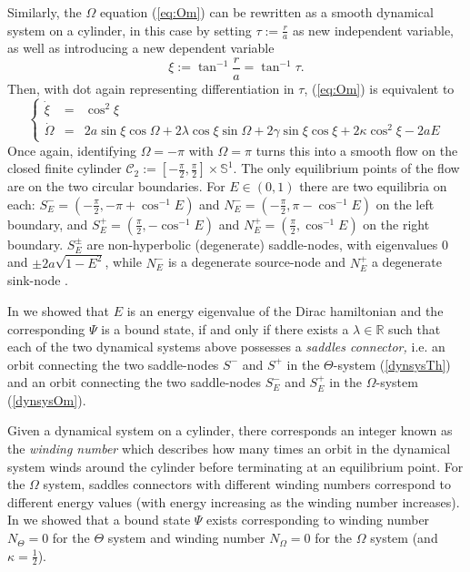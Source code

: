 \documentclass[11 pt]{article}
\newcommand\Om{\Omega}
\renewcommand\({\left(}
\renewcommand\){\right)}
\renewcommand\Om{\Omega}
\newcommand\<{\langle}
\renewcommand\>{\rangle}
\newcommand\8{\infty}
\newcommand\beq{\begin{equation}}
\newcommand\eeq{\end{equation}}
\newcommand{\ga} {\gamma}\newcommand{\Ga}{\Gamma}
\newcommand{\ka} {\kappa}
\newcommand{\la} {\lambda}\newcommand{\La}{\Lambda}
\newcommand{\R}{\mathbb R}
\newcommand{\cC}{\mathcal{C}}
\newcommand{\Sset}{\mathbb{S}}
\newcommand{\half}{\frac{1}{2}}
\begin{document}
Similarly, the $\Om$ equation (\ref{eq:Om}) can  be rewritten as a smooth dynamical system on a cylinder, in this case by setting 
$\tau := \frac{r}{a}$ as new independent variable, as well as introducing a new dependent variable
\beq
\xi := \tan^{-1}\frac{r}{a} = \tan^{-1}\tau.
\eeq
Then, with dot again representing differentiation in $\tau$, (\ref{eq:Om}) is equivalent to
\beq\label{dynsysOm}
\left\{\begin{array}{rcl}
\dot{\xi} & = & \cos^2\xi \\
\dot{\Om} & = & 2a\sin\xi\cos\Om+2\la\cos\xi\sin\Om + 2\ga\sin\xi\cos\xi+2\ka\cos^2\xi - 2aE
\end{array}\right.
\eeq
Once again, identifying $\Om=-\pi$ with $\Om  = \pi$ turns this into a smooth flow on the closed finite cylinder 
$\cC_2 := [-\frac{\pi}{2},\frac{\pi}{2}]\times \Sset^1$.  The only equilibrium points of the flow are on the two circular boundaries. 
For $E\in(0,1)$ there are two equilibria on each: $S^-_E = (-\frac{\pi}{2},-\pi+\cos^{-1}E)$ and $N^-_E=(-\frac{\pi}{2},\pi - \cos^{-1}E)$ 
on the left boundary, and $S^+_E = (\frac{\pi}{2}, -\cos^{-1}E)$ and $N^+_E = (\frac{\pi}{2},\cos^{-1}E)$ on the right boundary.
 $S^\pm_E$ are non-hyperbolic (degenerate) saddle-nodes, with eigenvalues $0$ and $\pm 2a\sqrt{1-E^2}$, while $N^-_E$ is a degenerate 
source-node and $N^+_E$ a degenerate sink-node \cite{QTPDS}. 


In \cite{KTZzGKNDa} we showed that $E$ is an energy eigenvalue of the Dirac hamiltonian  and the corresponding $\Psi$ is a bound state, if and only if there exists a $\la\in \R$ such that each of the two dynamical systems above possesses a {\em saddles connector,} i.e. an orbit connecting the two saddle-nodes $S^-$ and $S^+$ in the $\Theta$-system (\ref{dynsysTh}) 
and an orbit connecting the two saddle-nodes $S^-_E$ and $S^+_E$ in the $\Omega$-system (\ref{dynsysOm}). 

Given a dynamical system on a cylinder, there corresponds an integer known as the \emph{winding number} which describes how many times an orbit in the dynamical system winds around the cylinder before terminating at an equilibrium point. 
For the $\Omega$ system, saddles connectors with different winding numbers correspond to different energy values (with energy increasing as the winding number increases). In \cite{KTZzGKNDa} we showed that a bound state $\Psi$ exists corresponding to winding number $N_\Theta = 0$ for the $\Theta$ system and winding number $N_\Omega = 0$ for the $\Omega$ system (and $\kappa = \half$).
\end{document}
